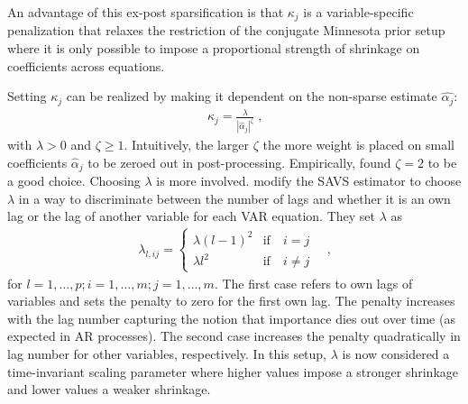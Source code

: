 An advantage of this ex-post sparsification is that $\kappa_j$ is a variable-specific penalization that relaxes the restriction of the conjugate Minnesota prior setup where it is only possible to impose a proportional strength of shrinkage on coefficients across equations.

Setting $\kappa_j$ can be realized by making it dependent on the non-sparse estimate $\hat{\alpha_j}$:
\begin{align}
    \kappa_j = \frac{\lambda}{| \hat{\alpha}_j |^\zeta} \; \text{,}
\end{align}
with $\lambda > 0$ and $\zeta \geq 1$. Intuitively, the larger $\zeta$ the more weight is placed on small coefficients $\hat{\alpha}_j$ to be zeroed out in post-processing. Empirically, \textcite{ray_signal_2018} found $\zeta = 2$ to be a good choice.  Choosing $\lambda$ is more involved. \textcite{hauzenberger_combining_2021} modify the SAVS estimator to choose $\lambda$ in a way to discriminate between the number of lags and whether it is an own lag or the lag of another variable for each VAR equation. They set $\lambda$ as
\begin{align}
    \lambda_{l,ij} = 
    \begin{cases}
        \lambda (l - 1)^2 & \text{if} \quad i = j \\
        \lambda l^2       & \text{if} \quad i \neq j
    \end{cases}
    \quad \text{,}
\end{align}
for $l = 1 , \dots , p ; i = 1 , \dots , m ; j = 1 , \dots , m$. The first case refers to own lags of variables and sets the penalty to zero for the first own lag. The penalty increases with the lag number capturing the notion that importance dies out over time (as expected in AR processes). The second case increases the penalty quadratically in lag number for other variables, respectively. In this setup, $\lambda$ is now considered a time-invariant scaling parameter where higher values impose a stronger shrinkage and lower values a weaker shrinkage.


